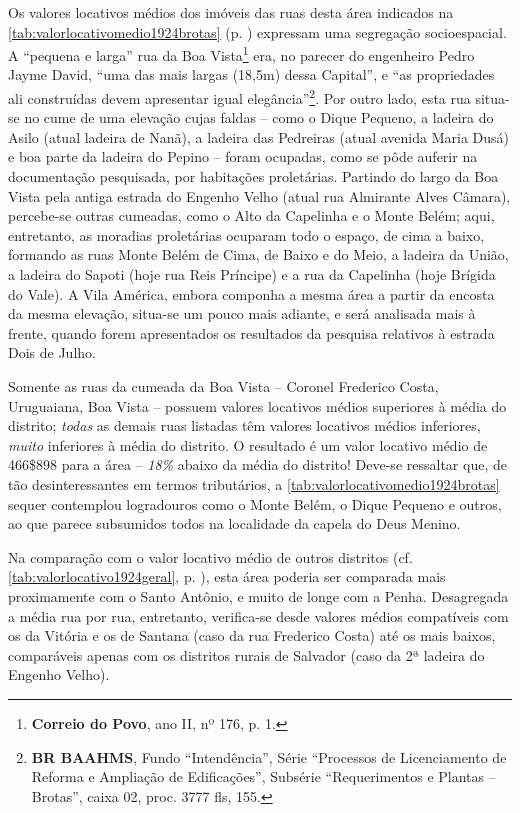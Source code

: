 
Os valores locativos médios dos imóveis das ruas desta área indicados na \autoref{tab:valorlocativomedio1924brotas} (p. \pageref{tab:valorlocativomedio1924brotas}) expressam uma segregação socioespacial. A ``pequena e larga'' rua da Boa Vista\footnote{\textbf{Correio do Povo}, ano II, nº 176, p. 1.} era, no parecer do engenheiro Pedro Jayme David, ``uma das mais largas (18,5m) dessa Capital'', e ``as propriedades ali construídas devem apresentar igual elegância''\footnote{\textbf{BR BAAHMS}, Fundo ``Intendência'', Série ``Processos de Licenciamento de Reforma e Ampliação de Edificações'', Subsérie ``Requerimentos e Plantas -- Brotas'', caixa 02, proc. 3777 fls, 155.}. Por outro lado, esta rua situa-se no cume de uma elevação cujas faldas -- como o Dique Pequeno, a ladeira do Asilo (atual ladeira de Nanã), a ladeira das Pedreiras (atual avenida Maria Dusá) e boa parte da ladeira do Pepino --  foram ocupadas, como se pôde auferir na documentação pesquisada, por habitações proletárias. Partindo do largo da Boa Vista pela antiga estrada do Engenho Velho (atual rua Almirante Alves Câmara), percebe-se outras cumeadas, como o Alto da Capelinha e o Monte Belém; aqui, entretanto, as moradias proletárias ocuparam todo o espaço, de cima a baixo, formando as ruas Monte Belém de Cima, de Baixo e do Meio, a ladeira da União, a ladeira do Sapoti (hoje rua Reis Príncipe) e a rua da Capelinha (hoje Brígida do Vale). A Vila América, embora componha a mesma área a partir da encosta da mesma elevação, situa-se um pouco mais adiante, e será analisada mais à frente, quando forem apresentados os resultados da pesquisa relativos à estrada Dois de Julho. 

Somente as ruas da cumeada da Boa Vista -- Coronel Frederico Costa, Uruguaiana, Boa Vista -- possuem valores locativos médios superiores à média do distrito; \textit{todas} as demais ruas listadas têm valores locativos médios inferiores, \textit{muito} inferiores à média do distrito. O resultado é um valor locativo médio de 466\$898 para a área -- \textit{18\%} abaixo da média do distrito! Deve-se ressaltar que, de tão desinteressantes em termos tributários, a \autoref{tab:valorlocativomedio1924brotas} sequer contemplou logradouros como o Monte Belém, o Dique Pequeno e outros, ao que parece subsumidos todos na localidade da capela do Deus Menino.

Na comparação com o valor locativo médio de outros distritos (cf. \autoref{tab:valorlocativo1924geral}, p. \pageref{tab:valorlocativo1924geral}), esta área poderia ser comparada mais proximamente com o Santo Antônio, e muito de longe com a Penha. Desagregada a média rua por rua, entretanto, verifica-se desde valores médios compatíveis com os da Vitória e os de Santana (caso da rua Frederico Costa) até os mais baixos, comparáveis apenas com os distritos rurais de Salvador (caso da 2ª ladeira do Engenho Velho).

